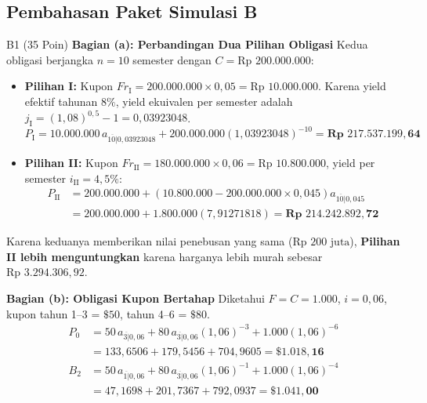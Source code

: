 \documentclass[11pt,a4paper]{article}
\newcommand{\angl}[1]{\overline{#1|}}
\begin{document}
\subsection*{\color{darkgreen} Pembahasan Paket Simulasi B}

\begin{solusibox}{B1 (35 Poin)}
\textbf{Bagian (a): Perbandingan Dua Pilihan Obligasi}
Kedua obligasi berjangka $n = 10$ semester dengan $C = \text{Rp }200.000.000$:
\begin{itemize}[leftmargin=5mm, topsep=1pt, itemsep=1pt]
    \item \textbf{Pilihan I:} Kupon $Fr_{\text{I}} = 200.000.000 \times 0{,}05 = \text{Rp }10.000.000$. Karena yield efektif tahunan $8\%$, yield ekuivalen per semester adalah $j_{\text{I}} = (1{,}08)^{0{,}5} - 1 = 0{,}03923048$.
    \[
        P_{\text{I}} = 10.000.000 \, a_{\angl{10}0{,}03923048} + 200.000.000(1{,}03923048)^{-10} = \mathbf{\text{Rp }217.537.199{,}64}
    \]
    \item \textbf{Pilihan II:} Kupon $Fr_{\text{II}} = 180.000.000 \times 0{,}06 = \text{Rp }10.800.000$, yield per semester $i_{\text{II}} = 4{,}5\%$:
    \begin{align*}
        P_{\text{II}} &= 200.000.000 + (10.800.000 - 200.000.000 \times 0{,}045)a_{\angl{10}0{,}045} \\
        &= 200.000.000 + 1.800.000(7{,}91271818) = \mathbf{\text{Rp }214.242.892{,}72}
    \end{align*}
\end{itemize}
Karena keduanya memberikan nilai penebusan yang sama ($\text{Rp }200\text{ juta}$), \textbf{Pilihan II lebih menguntungkan} karena harganya lebih murah sebesar $\text{Rp }3.294.306{,}92$.

\textbf{Bagian (b): Obligasi Kupon Bertahap}
Diketahui $F = C = 1.000$, $i = 0{,}06$, kupon tahun 1--3 = $\$50$, tahun 4--6 = $\$80$.
\begin{align*}
    P_0 &= 50\,a_{\angl{3}0{,}06} + 80\,a_{\angl{3}0{,}06}(1{,}06)^{-3} + 1.000(1{,}06)^{-6} \\
        &= 133{,}6506 + 179{,}5456 + 704{,}9605 = \mathbf{\$1.018{,}16} \\
    B_2 &= 50\,a_{\angl{1}0{,}06} + 80\,a_{\angl{3}0{,}06}(1{,}06)^{-1} + 1.000(1{,}06)^{-4} \\
        &= 47{,}1698 + 201{,}7367 + 792{,}0937 = \mathbf{\$1.041{,}00}
\end{align*}
\end{solusibox}
\end{document}
